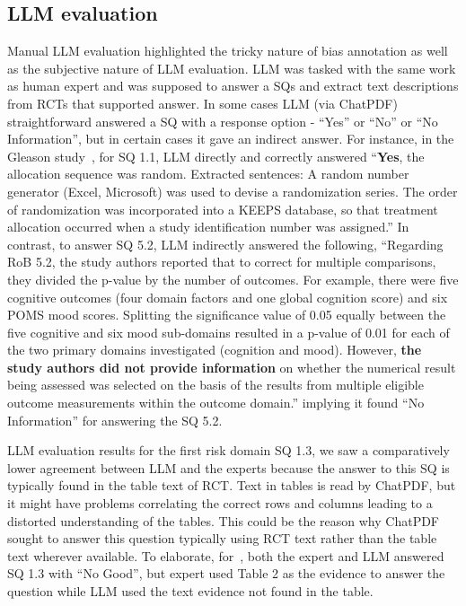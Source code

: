 \documentclass[sn-mathphys,Numbered]{sn-jnl}%
\theoremstyle{thmstyleone}%
\theoremstyle{thmstyletwo}%
\theoremstyle{thmstylethree}%
\begin{document}
\subsection{LLM evaluation}
\label{disc:llm}
%
Manual LLM evaluation highlighted the tricky nature of bias annotation as well as the subjective nature of LLM evaluation.
LLM was tasked with the same work as human expert and was supposed to answer a SQs and extract text descriptions from RCTs that supported answer.
In some cases LLM (via ChatPDF) straightforward answered a SQ with a response option - ``Yes'' or ``No'' or ``No Information'', but in certain cases it gave an indirect answer.
For instance, in the Gleason study~\cite{gleason2015effects}, for SQ 1.1, LLM directly and correctly answered ``\textbf{Yes}, the allocation sequence was random. Extracted sentences: A random number generator (Excel, Microsoft) was used to devise a randomization series. The order of randomization was incorporated into a KEEPS database, so that treatment allocation occurred when a study identification number was assigned.''
In contrast, to answer SQ 5.2, LLM indirectly answered the following, ``Regarding RoB 5.2, the study authors reported that to correct for multiple comparisons, they divided the p-value by the number of outcomes. For example, there were five cognitive outcomes (four domain factors and one global cognition score) and six POMS mood scores. Splitting the significance value of 0.05 equally between the five cognitive and six mood sub-domains resulted in a p-value of 0.01 for each of the two primary domains investigated (cognition and mood). However, \textbf{the study authors did not provide information} on whether the numerical result being assessed was selected on the basis of the results from multiple eligible outcome measurements within the outcome domain.'' implying it found ``No Information'' for answering the SQ 5.2.


LLM evaluation results for the first risk domain SQ 1.3, we saw a comparatively lower agreement between LLM and the experts because the answer to this SQ is typically found in the table text of RCT.
Text in tables is read by ChatPDF, but it might have problems correlating the correct rows and columns leading to a distorted understanding of the tables.
This could be the reason why ChatPDF sought to answer this question typically using RCT text rather than the table text wherever available.
To elaborate, for~\cite{stuck2015effect}, both the expert and LLM answered SQ 1.3 with ``No Good'', but expert used Table 2 as the evidence to answer the question while LLM used the text evidence not found in the table.
\end{document}
